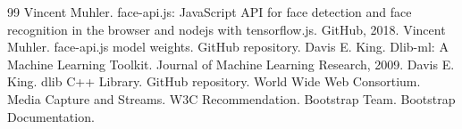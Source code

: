 \begin{thebibliography}{99}
 Vincent Muhler. face-api.js: JavaScript API for face detection and face recognition in the browser and nodejs with tensorflow.js. GitHub, 2018.
 Vincent Muhler. face-api.js model weights. GitHub repository.
 Davis E. King. Dlib-ml: A Machine Learning Toolkit. Journal of Machine Learning Research, 2009.
 Davis E. King. dlib C++ Library. GitHub repository.
 World Wide Web Consortium. Media Capture and Streams. W3C Recommendation.
 Bootstrap Team. Bootstrap Documentation.
\end{thebibliography}
